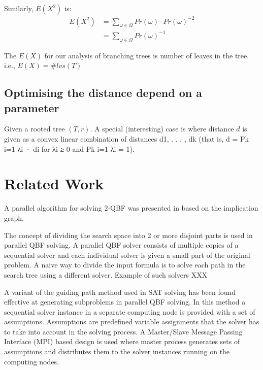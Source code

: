 \documentclass[runningheads]{llncs}
\begin{document}
Similarly, $E(X^{2})$ is:
\begin{align*}
E(X^{2}) &= \sum_{\omega \in \Omega} Pr(\omega) \cdot  Pr(\omega)^{-2} \\
    &= \sum_{\omega \in \Omega}  Pr(\omega)^{-1}
\end{align*}

The $E(X)$ for our analysis of branching trees is number of leaves in the tree. i.e., $E(X) = \#lvs(T)$



\subsection{Optimising the distance depend on a parameter} \label{optimsing-d}

Given a rooted tree $(T,r)$. A special (interesting) case is where distance $d$ is given as a convex linear
combination of distances d1, . . . , dk (that is, d =
Pk
i=1 λi
· di for λi ≥ 0 and
Pk
i=1 λi = 1). 

\section{Related Work} \label{sec:related-work}
A parallel algorithm for solving 2-QBF was presented in \cite{AspvallLLS96} based on the implication graph.

The concept of dividing the search space into 2 or more disjoint parts is used in parallel QBF solving. A parallel QBF solver consists of multiple copies of a sequential solver and each individual solver is given a small part of the original problem.
A naive way to divide the input formula is to solve each path in the search tree using a different solver. Example of such solvers XXX

A variant of the guiding path method used in SAT solving
has been found effective at generating subproblems in parallel QBF solving. In this method a sequential solver instance in a separate computing node is provided with a set of assumptions. Assumptions are predefined variable assignments that the solver has to take into account in the solving process. A Master/Slave Message Passing Interface (MPI) based design is used where master process generates sets of assumptions and distributes them to the solver instances running on the computing nodes.
\end{document}
